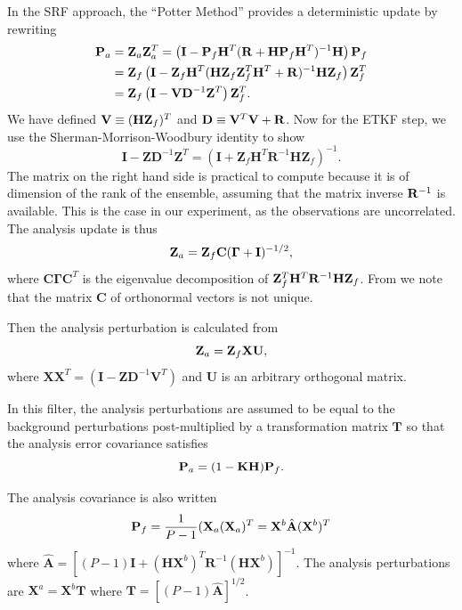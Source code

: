 In the SRF approach, the ``Potter Method'' provides a deterministic update by rewriting
\begin{align} \mathbf{P}_a &= \mathbf{Z}_a \mathbf{Z}_a^T = \left(\mathbf{I}-\mathbf{P}_f\mathbf{H}^T(\mathbf{R}+\mathbf{H}\mathbf{P}_f\mathbf{H}^T)^{-1}\mathbf{H}\right)\mathbf{P}_f \\
&= \mathbf{Z}_f\left(\mathbf{I}-\mathbf{Z}_f\mathbf{H}^T(\mathbf{H}\mathbf{Z}_f\mathbf{Z}_f^T\mathbf{H}^T+\mathbf{R})^{-1}\mathbf{H}\mathbf{Z}_f\right)\mathbf{Z}_f^T\\
&= \mathbf{Z}_f\left(\mathbf{I}-\mathbf{V}\mathbf{D}^{-1}\mathbf{Z}^T\right)\mathbf{Z}_f^T. \end{align}
We have defined $\mathbf{V}\equiv(\mathbf{H}\mathbf{Z}_f)^T$ and $\mathbf{D}\equiv\mathbf{V}^T\mathbf{V}+\mathbf{R}$.
Now for the ETKF step, we use the Sherman-Morrison-Woodbury identity to show
\begin{equation} \mathbf{I} - \mathbf{Z}\mathbf{D}^{-1}\mathbf{Z}^T = (\mathbf{I}+\mathbf{Z}_f\mathbf{H}^T\mathbf{R}^{-1}\mathbf{H}\mathbf{Z}_f)^{-1}.\end{equation}
The matrix on the right hand side is practical to compute because it is of dimension of the rank of the ensemble, assuming that the matrix inverse $\mathbf{R}^{-1}$ is available.
This is the case in our experiment, as the observations are uncorrelated.
The analysis update is thus
\begin{equation} \mathbf{Z}_a = \mathbf{Z}_f \mathbf{C}(\mathbf{\Gamma} +\mathbf{I})^{-1/2} ,\end{equation}
where $\mathbf{C}\mathbf{\Gamma}\mathbf{C}^T$ is the eigenvalue decomposition of $\mathbf{Z}_f^T\mathbf{H}^T\mathbf{R}^{-1}\mathbf{H}\mathbf{Z}_f$.
From  we note that the matrix $\mathbf{C}$ of orthonormal vectors is not unique.

Then the analysis perturbation is calculated from
\begin{equation} \mathbf{Z}_a = \mathbf{Z}_f \mathbf{X} \mathbf{U}, \end{equation}
where $\mathbf{X}\mathbf{X}^T = (\mathbf{I}-\mathbf{Z}\mathbf{D}^{-1}\mathbf{V}^T)$ and $\mathbf{U}$ is an arbitrary orthogonal matrix.

In this filter, the analysis perturbations are assumed to be equal to the background perturbations post-multiplied by a transformation matrix $\mathbf{T}$ so that the analysis error covariance satisfies
$$ \mathbf{P}_a = (1- \mathbf{K} \mathbf{H} ) \mathbf{P}_f .$$

The analysis covariance is also written
$$ \mathbf{P}_f = \frac{1}{P-1} ( \mathbf{X}_a (\mathbf{X}_a) ^T = \mathbf{X} ^b \hat{\mathbf{A}} (\mathbf{X} ^b) ^T $$
where $\hat{\mathbf{A}} = [(P-1) \mathbf{I} + (\mathbf{H} \mathbf{X} ^b ) ^T \mathbf{R} ^{-1} (\mathbf{H} \mathbf{X} ^b ) ] ^{-1} $.
The analysis perturbations are $\mathbf{X} ^a = \mathbf{X} ^b \mathbf{T}$ where $\mathbf{T} = [(P-1)\hat{\mathbf{A}} ] ^{1/2} $.

